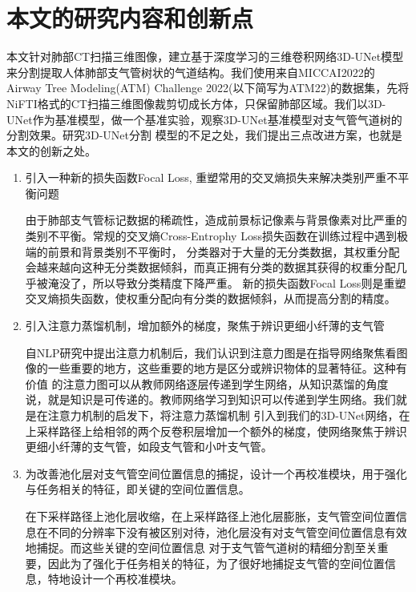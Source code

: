 \section{本文的研究内容和创新点}

本文针对肺部CT扫描三维图像，建立基于深度学习的三维卷积网络3D-UNet模型\cite{ronneberger2015u}来分割提取人体肺部支气管树状的气道结构。我们使用来自MICCAI2022的
Airway Tree Modeling(ATM) Challenge 2022(以下简写为ATM22\cite{Zhang2022CFDA, Qin2019AirwayNet, Yu2022Bronchi, Zhang2021Airway})的数据集，先将
NiFTI格式的CT扫描三维图像裁剪切成长方体，只保留肺部区域。我们以3D-UNet作为基准模型，做一个基准实验，观察3D-UNet基准模型对支气管气道树的分割效果。研究3D-UNet分割
模型的不足之处，我们提出三点改进方案，也就是本文的创新之处。

\begin{enumerate}

\item {\kaishu 引入一种新的损失函数Focal Loss, 重塑常用的交叉熵损失来解决类别严重不平衡问题}

由于肺部支气管标记数据的稀疏性，造成前景标记像素与背景像素对比严重的类别不平衡。常规的交叉熵Cross-Entrophy Loss损失函数在训练过程中遇到极端的前景和背景类别不平衡时，
分类器对于大量的无分类数据，其权重分配会越来越向这种无分类数据倾斜，而真正拥有分类的数据其获得的权重分配几乎被淹没了，所以导致分类精度下降严重。
新的损失函数Focal Loss则是重塑交叉熵损失函数，使权重分配向有分类的数据倾斜，从而提高分割的精度。

\item {\kaishu 引入注意力蒸馏机制，增加额外的梯度，聚焦于辨识更细小纤薄的支气管}

自NLP研究中提出注意力机制\cite{NIPS2017Attention}后，我们认识到注意力图是在指导网络聚焦看图像的一些重要的地方，这些重要的地方是区分或辨识物体的显著特征。这种有价值
的注意力图可以从教师网络逐层传递到学生网络，从知识蒸馏的角度说，就是知识是可传递的。教师网络学习到知识可以传递到学生网络。我们就是在注意力机制的启发下，将注意力蒸馏机制
引入到我们的3D-UNet网络，在上采样路径上给相邻的两个反卷积层增加一个额外的梯度，使网络聚焦于辨识更细小纤薄的支气管，如段支气管和小叶支气管。

\item {\kaishu 为改善池化层对支气管空间位置信息的捕捉，设计一个再校准模块，用于强化与任务相关的特征，即关键的空间位置信息。}

在下采样路径上池化层收缩，在上采样路径上池化层膨胀，支气管空间位置信息在不同的分辨率下没有被区别对待，池化层没有对支气管空间位置信息有效地捕捉。而这些关键的空间位置信息
对于支气管气道树的精细分割至关重要，因此为了强化于任务相关的特征，为了很好地捕捉支气管的空间位置信息，特地设计一个再校准模块。

\end{enumerate}



